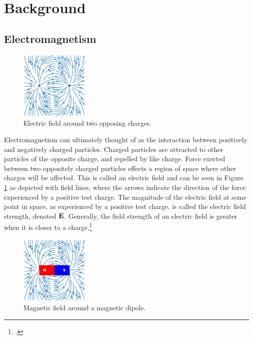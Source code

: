 \section*{Background}

\subsection*{Electromagnetism}

\begin{figure}
	\centering
	\vspace{-10pt}
	\includegraphics[width=0.3\textwidth]{figures/electric_field.png}
	\caption{Electric field around two opposing charges.}
	\label{fig:electric-field}
\end{figure}

Electromagnetism can ultimately thought of as the interaction between positively and negatively charged particles.
Charged particles are attracted to other particles of the opposite charge, and repelled by like charge.
Force exerted between two oppositely charged particles effects a region of space where other charges will be affected.
This is called an electric field and can be seen in Figure \ref{fig:electric-field} as depicted with field lines, where the arrows indicate the direction of the force experienced by a positive test charge.
The magnitude of the electric field at some point in space, as experienced by a positive test charge, is called the electric field strength, denoted $\bm{\mathbf{E}}$.
Generally, the field strength of an electric field is greater when it is closer to a charge.\footcite{britelectric}

\newpage

\begin{figure}
	\centering
	\includegraphics[width=0.3\textwidth]{figures/magnet_field.png}
	\caption{Magnetic field around a magnetic dipole.}
	\label{fig:magnet-field}
\end{figure}

